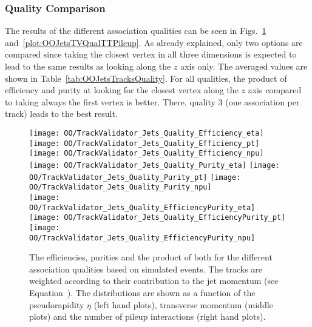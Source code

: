 \subsubsection{Quality Comparison \label{sec:OOJetsTracksQuality} }

The results of the different association qualities can be seen in Figs.~\ref{plot:OOJetsTVQualTTSignal} and~\ref{plot:OOJetsTVQualTTPileup}. As already explained, only two options are compared since taking the closest vertex in all three dimensions is expected to lead to the same results as looking along the $z$ axis only. The averaged values are shown in Table~\ref{tab:OOJetsTracksQuality}. For all qualities, the product of efficiency and purity at looking for the closest vertex along the $z$ axis compared to taking always the first vertex is better. There, quality 3 (one association per track) leads to the best result.

\begin{figure}[Ht]
  \centering
  \texttt{[image: OO/TrackValidator\_Jets\_Quality\_Efficiency\_eta]}
  \texttt{[image: OO/TrackValidator\_Jets\_Quality\_Efficiency\_pt]}
  \texttt{[image: OO/TrackValidator\_Jets\_Quality\_Efficiency\_npu]}
  \\
  \texttt{[image: OO/TrackValidator\_Jets\_Quality\_Purity\_eta]}
  \texttt{[image: OO/TrackValidator\_Jets\_Quality\_Purity\_pt]}
  \texttt{[image: OO/TrackValidator\_Jets\_Quality\_Purity\_npu]}
  \\
  \texttt{[image: OO/TrackValidator\_Jets\_Quality\_EfficiencyPurity\_eta]}
  \texttt{[image: OO/TrackValidator\_Jets\_Quality\_EfficiencyPurity\_pt]}
  \texttt{[image: OO/TrackValidator\_Jets\_Quality\_EfficiencyPurity\_npu]}
  \caption[Efficiencies, purities and their product of the different association qualities based on simulated \ttbar events with jet weight]{The efficiencies, purities and the product of both for the different association qualities based on simulated \ttbar events. The tracks are weighted according to their contribution to the jet momentum (see Equation~). The distributions are shown as a function of the pseudorapidity $\eta$ (left hand plots), transverse momentum (middle plots) and the number of pileup interactions (right hand plots). \label{plot:OOJetsTVQualTTSignal}}
\end{figure}

